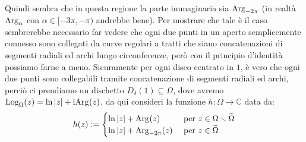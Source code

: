 \documentclass[11pt]{book}
\theoremstyle{Definizione}
\theoremstyle{TeoremaProposizioneLemmaCorollarioCongettura}
\theoremstyle{OsservazioneNotaEsempio}
\newcommand{\C}{\mathbb{C}}
\newcommand{\Disc}[3][]{D^{#1}_{{#2}}({#3})}
\newcommand{\tolto}{\smallsetminus}
\newcommand{\Arg}[1][]{\textup{Arg}_{#1}}
\renewcommand{\i}{\textup{i}}
\newcommand{\Log}[1][]{\textup{Log}_{#1}}
\newcommand{\frecciaIn}{
\tikz \draw[-latex] (-1pt,0) -- (1pt,0);
}
\newcommand{\frecciaOut}{
\tikz \draw[latex-] (-1pt,0) -- (1pt,0);
}
\begin{document}
\begin{center}
\end{center}
Quindi sembra che in questa regione la parte immaginaria sia $\Arg[-2\pi]$ (in realtà $\Arg[\alpha]$ con $\alpha \in [-3\pi,-\pi)$ andrebbe bene). Per mostrare che tale è il caso sembrerebbe necessario far vedere che ogni due punti in un aperto semplicemente connesso sono collegati da curve regolari a tratti che siano concatenazioni di segmenti radiali ed archi lungo circonferenze, però con il principio d'identità possiamo farne a meno. Sicuramente per ogni disco centrato in $1$, è vero che ogni due punti sono collegabili tramite concatenazione di segmenti radiali ed archi, perciò ci prendiamo un dischetto $\Disc{\delta}{1}\subseteq \Omega$, dove avremo $\Log[\Omega](z) = \ln|z|+\i\Arg(z)$, da qui consideri la funzione $h:\Omega\longrightarrow \C$  data da:
$$
h(z) := \begin{cases}
\ln|z|+\Arg(z) &\textup{ per }z\in \Omega \tolto \widetilde{\Omega}\\
\ln|z|+\Arg[-2\pi](z)&\textup{ per }z\in \widetilde{\Omega}
\end{cases}
$$
\end{document}
